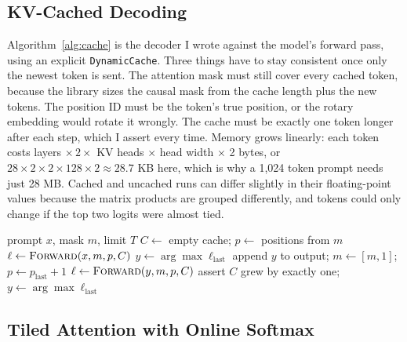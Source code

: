 \documentclass[conference]{IEEEtran}
\begin{document}
\subsection{KV-Cached Decoding}

Algorithm~\ref{alg:cache} is the decoder I wrote against the model's forward pass, using an explicit \texttt{DynamicCache}. Three things have to stay consistent once only the newest token is sent. The attention mask must still cover every cached token, because the library sizes the causal mask from the cache length plus the new tokens. The position ID must be the token's true position, or the rotary embedding would rotate it wrongly. The cache must be exactly one token longer after each step, which I assert every time. Memory grows linearly: each token costs layers $\times\,2\times$ KV heads $\times$ head width $\times$ 2 bytes, or $28\times2\times2\times128\times2 \approx 28.7$ KB here, which is why a 1,024 token prompt needs just 28 MB. Cached and uncached runs can differ slightly in their floating-point values because the matrix products are grouped differently, and tokens could only change if the top two logits were almost tied.

\begin{algorithm}[t]
\caption{Greedy decoding with an explicit KV cache}
\label{alg:cache}
\footnotesize
\begin{algorithmic}[1]
\Require prompt $x$, mask $m$, limit $T$
\State $C \gets$ empty cache; $p \gets$ positions from $m$
\State $\ell \gets \textsc{Forward}(x, m, p, C)$ 
\State $y \gets \arg\max \ell_{\text{last}}$
  \State append $y$ to output; $m \gets [m, 1]$; $p \gets p_{\text{last}} + 1$
  \State $\ell \gets \textsc{Forward}(y, m, p, C)$ 
  \State assert $C$ grew by exactly one; $y \gets \arg\max \ell_{\text{last}}$
\EndWhile
\end{algorithmic}
\end{algorithm}

\subsection{Tiled Attention with Online Softmax}
\end{document}
